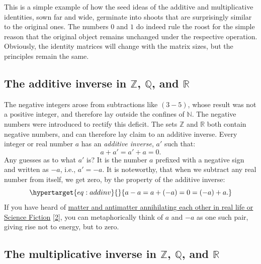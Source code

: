 \documentclass[
  a4paper,
]{article}
\begin{document}
This is a simple example of how the seed ideas of the additive and
multiplicative identities, sown far and wide, germinate into shoots that
are surprisingly similar to the original ones. The numbers \(0\) and
\(1\) do indeed rule the roost for the simple reason that the original
object remains unchanged under the respective operation. Obviously, the
identity matrices will change with the matrix sizes, but the principles
remain the same.

\hypertarget{the-additive-inverse-in-mathbbz-mathbbq-and-mathbbr}{%
\subsection{\texorpdfstring{The additive inverse in \(\mathbb{Z}\),
\(\mathbb{Q}\), and
\(\mathbb{R}\)}{The additive inverse in \textbackslash mathbb\{Z\}, \textbackslash mathbb\{Q\}, and \textbackslash mathbb\{R\}}}\label{the-additive-inverse-in-mathbbz-mathbbq-and-mathbbr}}

The negative integers arose from subtractions like \((3 - 5)\), whose
result was not a positive integer, and therefore lay outside the
confines of \(\mathbb{N}\). The negative numbers were introduced to
rectify this deficit. The sets \(\mathbb{Z}\) and \(\mathbb{R}\) both
contain negative numbers, and can therefore lay claim to an additive
inverse. Every integer or real number \(a\) has an \emph{additive
inverse}, \(a'\) such that: \[
a + a' = a' + a = 0.
\] Any guesses as to what \(a'\) is? It is the number \(a\) prefixed
with a negative sign and written as \(-a\), i.e., \(a' = -a\). It is
noteworthy, that when we subtract any real number from itself, we get
zero, by the property of the additive inverse:
\begin{equation}\protect\hypertarget{eq:addinv}{}{
a - a = a + (-a) = 0 = (-a) + a.
}\label{eq:addinv}\end{equation} If you have heard of
\href{https://www.symmetrymagazine.org/article/september-2008/antimatters-science-fiction-debut?language_content_entity=und}{matter
and antimatter annihilating each other in real life or Science Fiction}
{[}\protect\hyperlink{ref-antimatter2008}{2}{]}, you can metaphorically
think of \(a\) and \(-a\) as one such pair, giving rise not to energy,
but to zero. \normalfont

\hypertarget{the-multiplicative-inverse-in-mathbbz-mathbbq-and-mathbbr}{%
\subsection{\texorpdfstring{The multiplicative inverse in
\(\mathbb{Z}\), \(\mathbb{Q}\), and
\(\mathbb{R}\)}{The multiplicative inverse in \textbackslash mathbb\{Z\}, \textbackslash mathbb\{Q\}, and \textbackslash mathbb\{R\}}}\label{the-multiplicative-inverse-in-mathbbz-mathbbq-and-mathbbr}}
\end{document}
